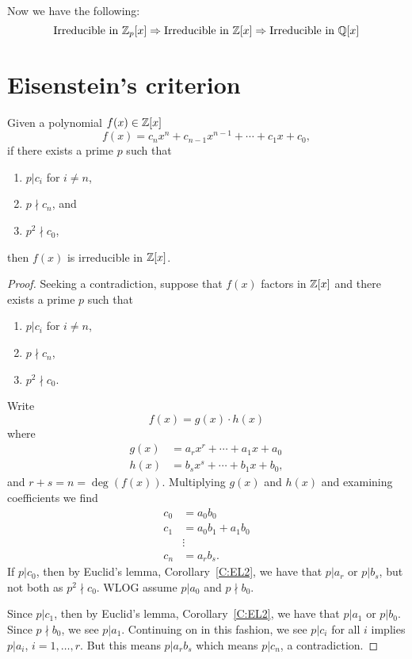 \documentclass{ximera}
\begin{document}
Now we have the following:
\[
\text{Irreducible in $\mathbb Z_p[x]$} \Rightarrow \text{Irreducible in $\mathbb Z[x]$}  \Rightarrow \text{Irreducible in $\mathbb Q[x]$}
\]


\section{Eisenstein's criterion}



\begin{theorem}\label{T:ec}
  Given a polynomial $f(x) \in\mathbb Z[x]$
  \[
  f(x) = c_nx^n + c_{n-1}x^{n-1} + \cdots + c_1 x + c_0,
  \]
  if there exists a prime $p$ such that
  \begin{enumerate}
  \item $p|c_i$ for $i \ne n$,
  \item $p\nmid c_n$, and
  \item $p^2\nmid c_0$,
  \end{enumerate}
  then $f(x)$ is irreducible in $\mathbb Z[x]$.
  \begin{proof}
    Seeking a contradiction, suppose that $f(x)$ factors in $\mathbb Z[x]$ and there exists a prime $p$ such that
  \begin{enumerate}
  \item $p|c_i$ for $i \ne n$,
  \item $p\nmid c_n$,
  \item $p^2\nmid c_0$.
  \end{enumerate}
  Write
  \[
  f(x) = g(x) \cdot h(x)
  \]
  where
  \begin{align*}
    g(x) &= a_rx^r + \cdots + a_1 x+ a_0\\
    h(x) &= b_sx^s + \cdots + b_1 x+ b_0,
  \end{align*}
  and $r + s = n = \deg(f(x))$. Multiplying $g(x)$ and $h(x)$ and
  examining coefficients we find
  \begin{align*}
    c_0 &= a_0b_0\\
    c_1 &= a_0b_1 + a_1 b_0\\
    &\vdots \\
    c_n &= a_r b_s.
  \end{align*}
  If $p| c_0$, then by Euclid's lemma, Corollary~\ref{C:EL2}, we have
    that $p|a_r$ or $p|b_s$, but not both as $p^2\nmid c_0$. WLOG
    assume $p|a_0$ and $p\nmid b_0$.

    Since $p|c_1$, then by Euclid's lemma, Corollary~\ref{C:EL2}, we
    have that $p|a_1$ or $p|b_0$. Since $p\nmid b_0$, we see
    $p|a_1$. Continuing on in this fashion, we see $p|c_i$ for all $i$
    implies $p| a_i$, $i=1,\dots, r$. But this means $p|a_rb_s$ which
    means $p|c_n$, a contradiction.
  \end{proof}
\end{theorem}
\end{document}
